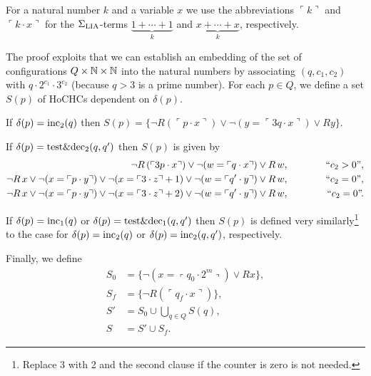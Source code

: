 \documentclass[a4paper,twoside,notitlepage,openright,11pt]{report}
\begin{document}
For a natural number $k$ and a variable $x$ we use the abbreviations $\ulcorner k\urcorner$ and $\ulcorner k\cdot x\urcorner$ for the $\Sigma_{\operatorname{LIA}}$-terms $\underbrace{1+\cdots+1}_{k}$ and $\underbrace{x+\cdots+x}_{k}$, respectively.

The proof exploits that we can establish an embedding of the set of configurations $Q\times\mathbb N\times\mathbb N$ into the natural numbers by associating $(q,c_1,c_2)$ with $q\cdot 2^{c_1}\cdot 3^{c_2}$ (because $q>3$ is a prime number).
For each $p\in Q$, we define a set $S(p)$ of HoCHCs dependent on $\delta(p)$.
\begin{thmlist}
\item If $\delta(p)=\operatorname{inc}_2(q)$ then $S(p)=\{\neg R(\ulcorner p\cdot x\urcorner)\lor\neg(y=\ulcorner 3q\cdot x\urcorner)\lor Ry\}$.
\item If $\delta(p)=\operatorname{test\&dec}_2(q,q')$ then $S(p)$ is given by
  \begin{align*}
    \neg R\,(\ulcorner 3p\cdot x\urcorner)\lor\neg(w=\ulcorner q\cdot x\urcorner)\lor R\,w,&&&&\text{``$c_2>0$''},\\
    \neg R\,x\lor\neg (x=\ulcorner p\cdot y\urcorner)\lor\neg (x=\ulcorner 3\cdot z\urcorner+1)\lor\neg(w=\ulcorner q'\cdot y\urcorner)\lor R\,w,&&&&\text{``$c_2=0$''},\\
    \neg R\,x\lor\neg (x=\ulcorner p\cdot y\urcorner)\lor\neg (x=\ulcorner 3\cdot z\urcorner+2)\lor\neg(w=\ulcorner q'\cdot y\urcorner)\lor R\,w,&&\hspace{0.7cm}&&\text{``$c_2=0$''.}
  \end{align*}
\item If $\delta(p)=\operatorname{inc}_1(q)$ or $\delta(p)=\operatorname{test\&dec}_1(q,q')$ then $S(p)$ is defined very similarly\footnote{Replace 3 with 2 and the second clause if the counter is zero is not needed.} to the case for $\delta(p)=\operatorname{inc}_2(q)$ or $\delta(p)=\operatorname{inc}_2(q,q')$, respectively.
\end{thmlist}

Finally, we define
\begin{align*}
  S_0&=\{\neg(x=\left\ulcorner q_0\cdot 2^m\right\urcorner)\lor R x\},\\
  S_f&=\{\neg R(\ulcorner q_f\cdot x\urcorner)\},\\
  S'&=S_0\cup\bigcup_{q\in Q}S(q),\\
  S&=S'\cup S_f.
\end{align*}
\end{document}

